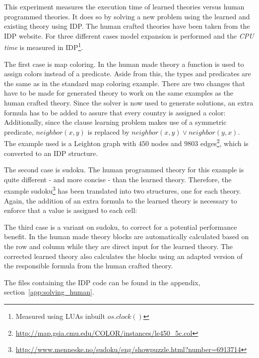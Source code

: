 \begin{experiment}
\label{exp:human_speed}
	This experiment measures the execution time of learned theories versus human programmed theories.
	It does so by solving a new problem using the learned and existing theory using IDP.
	The human crafted theories have been taken from the IDP website.
	For three different cases model expansion is performed and the \emph{CPU time} is measured in IDP\footnote{Measured using LUAs inbuilt $os.clock()$}.

	The first case is map coloring.
	In the human made theory a function is used to assign colors instead of a predicate.
	Aside from this, the types and predicates are the same as in the standard map coloring example.
	There are two changes that have to be made for generated theory to work on the same examples as the human crafted theory.
	Since the solver is now used to generate solutions, an extra formula has to be added to assure that every country is assigned a color:
	Additionally, since the clause learning problem makes use of a symmetric predicate, $\mathit{neighbor}(x, y)$ is replaced by $\mathit{neighbor}(x, y) \lor \mathit{neighbor(y,x)}$.
	The example used is a Leighton graph with $450$ nodes and $9803$ edges\footnote{\url{http://map.gsia.cmu.edu/COLOR/instances/le450_5c.col}}, which is converted to an IDP structure.

	The second case is sudoku.
	The human programmed theory for this example is quite different - and more concise - than the learned theory.
	Therefore, the example sudoku\footnote{\url{http://www.menneske.no/sudoku/eng/showpuzzle.html?number=6913714}} has been translated into two structures, one for each theory.
	Again, the addition of an extra formula to the learned theory is necessary to enforce that a value is assigned to each cell: 

	The third case is a variant on sudoku, to correct for a potential performance benefit.
	In the human made theory blocks are automatically calculated based on the row and column while they are direct input for the learned theory.
	The corrected learned theory also calculates the blocks using an adapted version of the responsible formula from the human crafted theory.

	The files containing the IDP code can be found in the appendix, section~\ref{app:solving_human}.



\end{experiment}
